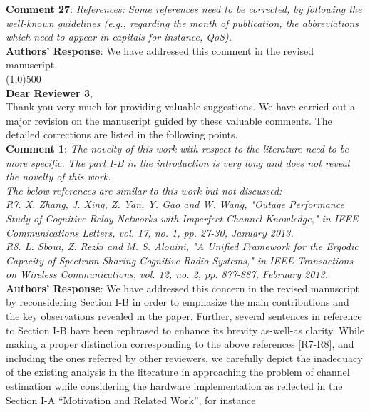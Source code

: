 \documentclass[12pt,a4wide,peerreview]{IEEEtran}
\newcommand{\tc}[1]{#1}
\begin{document}
\textbf{\tc{Comment 27}}: 
\textit{
References: Some references need to be corrected, by following the well-known guidelines (e.g., regarding the month of publication, the abbreviations which need to appear in capitals for instance, QoS).
}
\\
\textbf{Authors' Response}:
We have addressed this comment in the revised manuscript.\\
\line(1,0){500} \\
\textbf{Dear Reviewer 3},\\
Thank you very much for providing valuable suggestions. We have carried out a major revision on the manuscript guided by these valuable comments. The detailed corrections are listed in the following points. \\
\textbf{{Comment 1}}: 
\textit{
The novelty of this work with respect to the literature need to be more specific. The part I-B in the introduction is very long and does not reveal the novelty of this work.
\\
The below references are similar to this work but not discussed: \\
R7. X. Zhang, J. Xing, Z. Yan, Y. Gao and W. Wang, "Outage Performance Study of Cognitive Relay Networks with Imperfect Channel Knowledge," in IEEE Communications Letters, vol. 17, no. 1, pp. 27-30, January 2013.  \\
R8. L. Sboui, Z. Rezki and M. S. Alouini, "A Unified Framework for the Ergodic Capacity of Spectrum Sharing Cognitive Radio Systems," in IEEE Transactions on Wireless Communications, vol. 12, no. 2, pp. 877-887, February 2013.
}
\\
\textbf{Authors' Response}:
We have addressed this concern in the revised manuscript by reconsidering Section I-B in order to emphasize the main contributions and the key observations revealed in the paper. Further, several sentences in reference to Section I-B have been rephrased to enhance its brevity as-well-as clarity. While making a proper distinction corresponding to the above references [R7-R8], and including the ones referred by other reviewers, we carefully depict the inadequacy of the existing analysis in the literature in approaching the problem of channel estimation while considering the hardware implementation as reflected in the Section I-A ``Motivation and Related Work'', for instance
\end{document}
